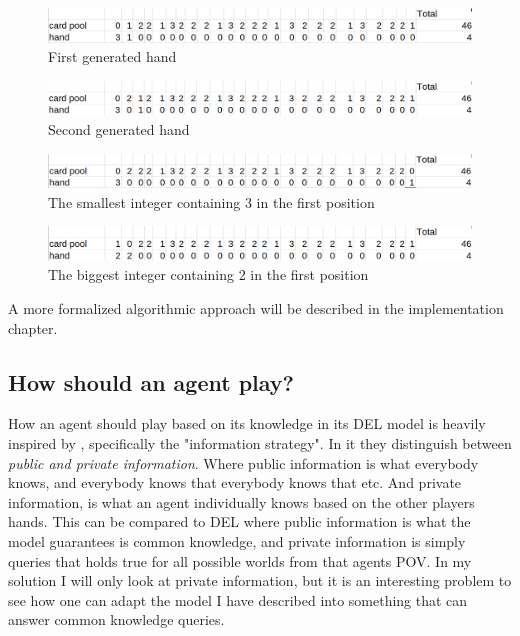\begin{figure}
	\centering
\includegraphics[width=13cm,frame]{images/biggest_integer.png}
	\caption{First generated hand}
	\label{fig:biggest-integer}
\end{figure}

\begin{figure}
	\centering
\includegraphics[width=13cm,frame]{images/next-biggest.png}
	\caption{Second generated hand}
	\label{fig:next-integer}
\end{figure}

\begin{figure}
	\centering
\includegraphics[width=13cm,frame]{images/etc_one.png}
	\caption{The smallest integer containing 3 in the first position}
	\label{fig:etc-one}
\end{figure}


\begin{figure}
	\centering
\includegraphics[width=13cm,frame]{images/decrement.png}
	\caption{The biggest integer containing 2 in the first position}
	\label{fig:decrement}
\end{figure}


A more formalized algorithmic approach will be described in the implementation chapter.


\subsection{How should an agent play?}

How an agent should play based on its knowledge in its DEL model is heavily inspired by \cite{CoxEtAl2015}, specifically the "information strategy". 
In it they distinguish between \emph{public and private information}. Where public information is what everybody knows, and everybody knows that everybody knows that etc. And private information, is what an agent individually knows based on the other players hands. This can be compared to DEL where public information is what the model guarantees is common knowledge, and private information is simply queries that holds true for all possible worlds from that agents POV.
In my solution I will only look at private information, but it is an interesting problem to see how one can adapt the model I have described into something that can answer common knowledge queries.


